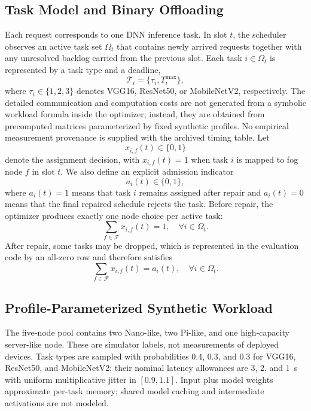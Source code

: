 \documentclass[pdflatex,sn-mathphys-num]{sn-jnl}
\begin{document}
\subsection{Task Model and Binary Offloading}
Each request corresponds to one DNN inference task. In slot $t$, the scheduler observes an active task set $\Omega_t$ that contains newly arrived requests together with any unresolved backlog carried from the previous slot. Each task $i \in \Omega_t$ is represented by a task type and a deadline,
\begin{equation}
    \mathcal{T}_i = \{\tau_i, T_i^{\max}\},
\end{equation}
where $\tau_i \in \{1,2,3\}$ denotes VGG16, ResNet50, or MobileNetV2, respectively. The detailed communication and computation costs are not generated from a symbolic workload formula inside the optimizer; instead, they are obtained from precomputed matrices parameterized by fixed synthetic profiles. No empirical measurement provenance is supplied with the archived timing table. Let
\begin{equation}
    x_{i,f}(t) \in \{0,1\}
\end{equation}
denote the assignment decision, with $x_{i,f}(t)=1$ when task $i$ is mapped to fog node $f$ in slot $t$. We also define an explicit admission indicator
\begin{equation}
    a_i(t) \in \{0,1\},
\end{equation}
where $a_i(t)=1$ means that task $i$ remains assigned after repair and $a_i(t)=0$ means that the final repaired schedule rejects the task. Before repair, the optimizer produces exactly one node choice per active task:
\begin{equation}
    \sum_{f \in \mathcal{F}} x_{i,f}(t)=1,\quad \forall i \in \Omega_t.
\end{equation}
After repair, some tasks may be dropped, which is represented in the evaluation code by an all-zero row and therefore satisfies
\begin{equation}
    \sum_{f \in \mathcal{F}} x_{i,f}(t)=a_i(t),\quad \forall i \in \Omega_t.
\end{equation}

\subsection{Profile-Parameterized Synthetic Workload}
The five-node pool contains two Nano-like, two Pi-like, and one high-capacity server-like node. These are simulator labels, not measurements of deployed devices. Task types are sampled with probabilities 0.4, 0.3, and 0.3 for VGG16, ResNet50, and MobileNetV2; their nominal latency allowances are 3, 2, and 1~s with uniform multiplicative jitter in $[0.9,1.1]$. Input plus model weights approximate per-task memory; shared model caching and intermediate activations are not modeled.
\end{document}
